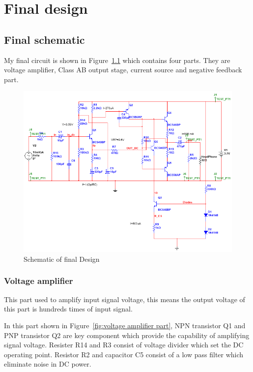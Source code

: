 \chapter{Final design}

\section{Final schematic}

My final circuit is shown in Figure~\ref{fig:final schematic} which contains four parts. They are voltage amplifier, Class AB output stage, current source and negative feedback part.



\begin{figure}[htbp]
	\centering
	\includegraphics[scale=0.8]{"../Photo/Chap5/final schematic"}
	\caption{Schematic of final Design }
	\label{fig:final schematic}
\end{figure}


\subsection{Voltage amplifier}  

This part used to amplify input signal voltage, this means the output voltage of this part is hundreds times of input signal.


In this part shown in Figure~\ref{fig:voltage amplifier part}, NPN transistor Q1 and PNP transistor Q2 are key component which provide the capability of amplifying signal voltage. Resister R14 and R3 consist of voltage divider which set the DC operating point. Resistor R2 and capacitor C5 consist of a low pass filter which eliminate noise in DC power.

